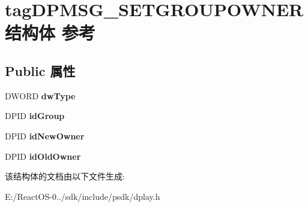 \hypertarget{structtag_d_p_m_s_g___s_e_t_g_r_o_u_p_o_w_n_e_r}{}\section{tag\+D\+P\+M\+S\+G\+\_\+\+S\+E\+T\+G\+R\+O\+U\+P\+O\+W\+N\+E\+R结构体 参考}
\label{structtag_d_p_m_s_g___s_e_t_g_r_o_u_p_o_w_n_e_r}
\subsection*{Public 属性}
\begin{DoxyCompactItemize}
\item 
\mbox{\label{structtag_d_p_m_s_g___s_e_t_g_r_o_u_p_o_w_n_e_r_ac65f1c8bac89511f52e15d75cd855b20}} 
D\+W\+O\+RD {\bfseries dw\+Type}
\item 
\mbox{\label{structtag_d_p_m_s_g___s_e_t_g_r_o_u_p_o_w_n_e_r_a1c19a11e91e42be5616a3fd6ae3607bf}} 
D\+P\+ID {\bfseries id\+Group}
\item 
\mbox{\label{structtag_d_p_m_s_g___s_e_t_g_r_o_u_p_o_w_n_e_r_a784a33bd350782cc696aac738609f93a}} 
D\+P\+ID {\bfseries id\+New\+Owner}
\item 
\mbox{\label{structtag_d_p_m_s_g___s_e_t_g_r_o_u_p_o_w_n_e_r_ac8391cbcca94630ce8cde2ab25d8edc5}} 
D\+P\+ID {\bfseries id\+Old\+Owner}
\end{DoxyCompactItemize}


该结构体的文档由以下文件生成\+:\begin{DoxyCompactItemize}
\item 
E\+:/\+React\+O\+S-\/0../sdk/include/psdk/dplay.\+h\end{DoxyCompactItemize}
